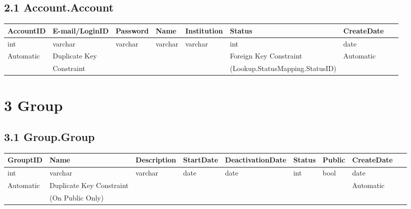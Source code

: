 \documentclass[12pt,fleqn]{article}
\begin{document}
\subsection*{2.1 Account.Account }
\begin{table}[htbp]
\centering
\footnotesize
\label{DB changes}
    \begin{tabular}{|l|l|l|l|l|l|l|l|}
        \hline
        AccountID & E-mail/LoginID & Password & Name & Institution & Status & CreateDate & ~\\ \hline
        int & varchar & varchar & varchar & varchar & int & date & ~ \\ \hline
        Automatic & Duplicate Key  & ~ & ~ & ~ & Foreign Key Constraint & Automatic & ~ \\ 
        ~ &  Constraint & ~ & ~ & ~ & (Lookup.StatusMapping.StatusID) & ~ & ~ \\ \hline
        \hline
    \end{tabular}
\end{table}
\FloatBarrier
\newpage
\section* {3 Group}

\subsection*{3.1 Group.Group }
\begin{table}[htbp]
\centering
\footnotesize
\label{DB changes}
    \begin{tabular}{|l|l|l|l|l|l|l|l|l|}
        \hline
        GrouptID & Name & Description & StartDate & DeactivationDate & Status & Public & CreateDate & ~\\ \hline
        int & varchar & varchar & date & date & int & bool & date & ~ \\ \hline
        Automatic & Duplicate Key Constraint  & ~ & ~ & ~ & ~ & ~ & Automatic & ~ \\ 
        ~ &  (On Public Only) & ~ & ~ & ~ & ~ & ~ & ~ & ~ \\ 
        \hline
    \end{tabular}
\end{table}
\FloatBarrier
\end{document}
